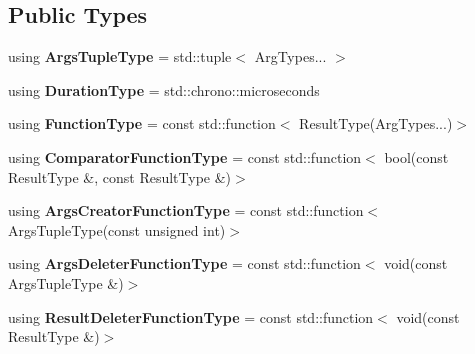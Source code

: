 \subsection*{Public Types}
\begin{DoxyCompactItemize}
\item 
using {\bfseries Args\+Tuple\+Type} = std\+::tuple$<$ Arg\+Types... $>$\hypertarget{classunittest_1_1_randomized_function_test_aa105ce4c0e10c2a0e8cbc38c8d4f6b69}{}\label{classunittest_1_1_randomized_function_test_aa105ce4c0e10c2a0e8cbc38c8d4f6b69}

\item 
using {\bfseries Duration\+Type} = std\+::chrono\+::microseconds\hypertarget{classunittest_1_1_randomized_function_test_a26d09b29cd58b5896faa1b42b21d5842}{}\label{classunittest_1_1_randomized_function_test_a26d09b29cd58b5896faa1b42b21d5842}

\item 
using {\bfseries Function\+Type} = const std\+::function$<$ Result\+Type(Arg\+Types...)$>$\hypertarget{classunittest_1_1_randomized_function_test_a6c55e8a95a11f3914e1ff2cd207bf6ef}{}\label{classunittest_1_1_randomized_function_test_a6c55e8a95a11f3914e1ff2cd207bf6ef}

\item 
using {\bfseries Comparator\+Function\+Type} = const std\+::function$<$ bool(const Result\+Type \&, const Result\+Type \&)$>$\hypertarget{classunittest_1_1_randomized_function_test_ab136f23c2b4fd17371d5f3b646bff9ec}{}\label{classunittest_1_1_randomized_function_test_ab136f23c2b4fd17371d5f3b646bff9ec}

\item 
using {\bfseries Args\+Creator\+Function\+Type} = const std\+::function$<$ Args\+Tuple\+Type(const unsigned int)$>$\hypertarget{classunittest_1_1_randomized_function_test_af50df2e89d75e2f2d92fad8487cd3502}{}\label{classunittest_1_1_randomized_function_test_af50df2e89d75e2f2d92fad8487cd3502}

\item 
using {\bfseries Args\+Deleter\+Function\+Type} = const std\+::function$<$ void(const Args\+Tuple\+Type \&)$>$\hypertarget{classunittest_1_1_randomized_function_test_aaf569b896f7c0da587ef4f20d7e8068f}{}\label{classunittest_1_1_randomized_function_test_aaf569b896f7c0da587ef4f20d7e8068f}

\item 
using {\bfseries Result\+Deleter\+Function\+Type} = const std\+::function$<$ void(const Result\+Type \&)$>$\hypertarget{classunittest_1_1_randomized_function_test_ac9ba57a07a2cc6045f5e6ea666720dfb}{}\label{classunittest_1_1_randomized_function_test_ac9ba57a07a2cc6045f5e6ea666720dfb}


\end{DoxyCompactItemize}
